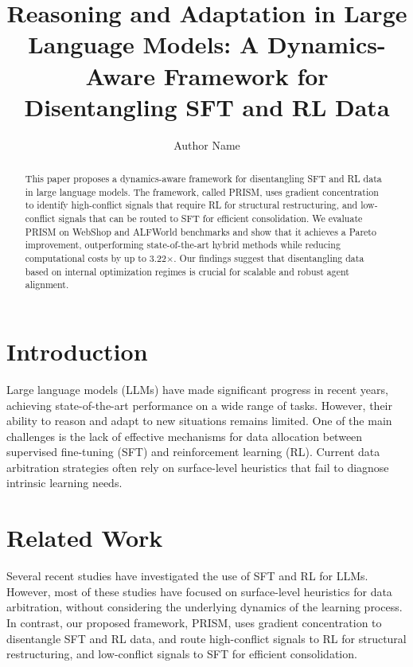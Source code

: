 \documentclass{article}
\begin{document}
\title{Reasoning and Adaptation in Large Language Models: A Dynamics-Aware Framework for Disentangling SFT and RL Data}

\author{Author Name}

\maketitle

\begin{abstract}
This paper proposes a dynamics-aware framework for disentangling SFT and RL data in large language models. The framework, called PRISM, uses gradient concentration to identify high-conflict signals that require RL for structural restructuring, and low-conflict signals that can be routed to SFT for efficient consolidation. We evaluate PRISM on WebShop and ALFWorld benchmarks and show that it achieves a Pareto improvement, outperforming state-of-the-art hybrid methods while reducing computational costs by up to 3.22$\times$. Our findings suggest that disentangling data based on internal optimization regimes is crucial for scalable and robust agent alignment.
\end{abstract}

\section{Introduction}

Large language models (LLMs) have made significant progress in recent years, achieving state-of-the-art performance on a wide range of tasks. However, their ability to reason and adapt to new situations remains limited. One of the main challenges is the lack of effective mechanisms for data allocation between supervised fine-tuning (SFT) and reinforcement learning (RL). Current data arbitration strategies often rely on surface-level heuristics that fail to diagnose intrinsic learning needs.

\section{Related Work}

Several recent studies have investigated the use of SFT and RL for LLMs. However, most of these studies have focused on surface-level heuristics for data arbitration, without considering the underlying dynamics of the learning process. In contrast, our proposed framework, PRISM, uses gradient concentration to disentangle SFT and RL data, and route high-conflict signals to RL for structural restructuring, and low-conflict signals to SFT for efficient consolidation.
\end{document}
